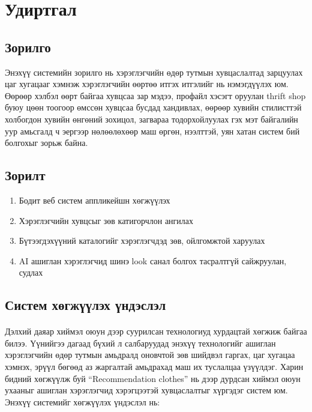 
\section*{Удиртгал}
\subsection*{Зорилго}
\par Энэхүү системийн зорилго нь хэрэглэгчийн  өдөр тутмын хувцаслалтад зарцуулах цаг хугацааг хэмнэж хэрэглэгчийн өөртөө итгэх итгэлийг нь нэмэгдүүлэх юм. Өөрөөр хэлбэл өөрт байгаа хувцсаа зар мэдээ, профайл хэсэгт оруулан thrift shop буюу цөөн тоогоор өмссөн хувцсаа бусдад хандивлах, өөрөөр хувийн стилисттэй холбогдон хувийн өнгөний зохицол, загвараа тодорхойлуулах гэх мэт байгалийн уур амьсгалд ч эергээр нөлөөлөхөөр маш өргөн, нээлттэй, уян хатан систем бий болгохыг зорьж байна.
\subsection*{Зорилт}
\begin{enumerate}
   \item Бодит веб систем аппликейшн хөгжүүлэх 
   \item Хэрэглэгчийн хувцсыг зөв катигорчлон ангилах
   \item Бүтээгдэхүүний каталогийг хэрэглэгчдэд зөв, ойлгомжтой харуулах
   \item AI ашиглан хэрэглэгчид шинэ look санал болгох
    тасралтгүй сайжруулан, судлах
\end{enumerate}
\subsection*{Систем хөгжүүлэх үндэслэл}
\paragraph{}Дэлхий даяар хиймэл оюун дээр суурилсан технологиуд хурдацтай хөгжиж байгаа билээ. Үүнийгээ дагаад бүхий л салбаруудад энэхүү  технологийг  ашиглан хэрэглэгчийн өдөр тутмын амьдралд оновчтой зөв шийдвэл гаргах, цаг хугацаа хэмнэх, эрүүл  бөгөөд аз жаргалтай амьдрахад маш их туслалцаа үзүүлдэг. Харин бидний хөгжүүлж буй “Recommendation clothes” нь дээр дурдсан хиймэл оюун ухааныг ашиглан хэрэглэгчид хэрэгцээтэй хувцаслалтыг хүргэдэг систем юм.\\
Энэхүү системийг хөгжүүлэх үндэслэл нь:


